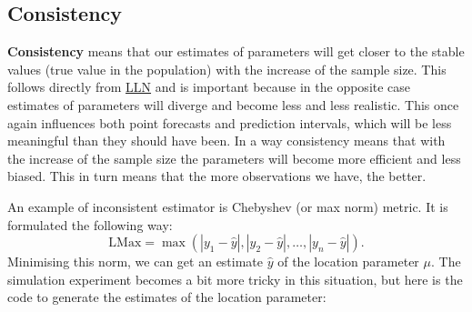 \documentclass[
]{book}
\newenvironment{Shaded}{\begin{snugshade}}{\end{snugshade}}
\newcommand{\AttributeTok}[1]{\textcolor[rgb]{0.13,0.29,0.53}{#1}}
\newcommand{\ControlFlowTok}[1]{\textcolor[rgb]{0.13,0.29,0.53}{\textbf{#1}}}
\newcommand{\DecValTok}[1]{\textcolor[rgb]{0.00,0.00,0.81}{#1}}
\newcommand{\FunctionTok}[1]{\textcolor[rgb]{0.13,0.29,0.53}{\textbf{#1}}}
\newcommand{\NormalTok}[1]{#1}
\newcommand{\OtherTok}[1]{\textcolor[rgb]{0.56,0.35,0.01}{#1}}
\newcommand{\SpecialCharTok}[1]{\textcolor[rgb]{0.81,0.36,0.00}{\textbf{#1}}}
\newcommand{\StringTok}[1]{\textcolor[rgb]{0.31,0.60,0.02}{#1}}
\theoremstyle{definition}
\theoremstyle{definition}
\theoremstyle{definition}
\theoremstyle{definition}
\theoremstyle{remark}
\begin{document}
\subsection{Consistency}\label{estimatesPropertiesConsistency}

\textbf{Consistency} means that our estimates of parameters will get closer to the stable values (true value in the population) with the increase of the sample size. This follows directly from \hyperref[LLNandCLT]{LLN} and is important because in the opposite case estimates of parameters will diverge and become less and less realistic. This once again influences both point forecasts and prediction intervals, which will be less meaningful than they should have been. In a way consistency means that with the increase of the sample size the parameters will become more efficient and less biased. This in turn means that the more observations we have, the better.

An example of inconsistent estimator is Chebyshev (or max norm) metric. It is formulated the following way:
\begin{equation}
    \mathrm{LMax} = \max \left(|y_1-\hat{y}|, |y_2-\hat{y}|, \dots, |y_n-\hat{y}| \right).
    \label{eq:chebyshevNorm}
\end{equation}
Minimising this norm, we can get an estimate \(\hat{y}\) of the location parameter \(\mu\). The simulation experiment becomes a bit more tricky in this situation, but here is the code to generate the estimates of the location parameter:

\begin{Shaded}
\end{Shaded}
\end{document}
